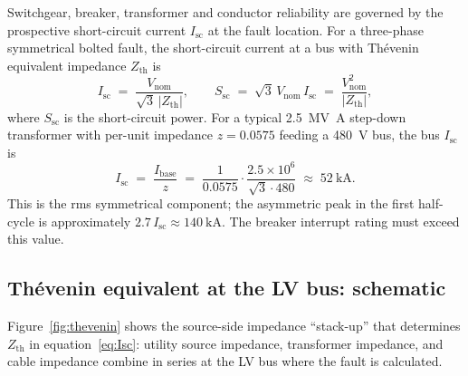 Switchgear, breaker, transformer and conductor reliability are
governed by the prospective short-circuit current $I_{\mathrm{sc}}$ at
the fault location. For a three-phase symmetrical bolted fault, the
short-circuit current at a bus with Th\'evenin equivalent impedance
$Z_{\mathrm{th}}$ is
\begin{equation}\label{eq:Isc}
   I_{\mathrm{sc}} \;=\; \frac{V_{\mathrm{nom}}}{\sqrt{3}\,|Z_{\mathrm{th}}|},
   \qquad
   S_{\mathrm{sc}} \;=\; \sqrt{3}\,V_{\mathrm{nom}}\,I_{\mathrm{sc}}
   \;=\; \frac{V_{\mathrm{nom}}^2}{|Z_{\mathrm{th}}|},
\end{equation}
where $S_{\mathrm{sc}}$ is the short-circuit power. For a typical
\SI{2.5}{\mega\volt\ampere} step-down transformer with per-unit
impedance $z=0.0575$ feeding a \SI{480}{V} bus, the bus
$I_{\mathrm{sc}}$ is
\begin{equation}
   I_{\mathrm{sc}}
   \;=\; \frac{I_{\mathrm{base}}}{z}
   \;=\; \frac{1}{0.0575}\cdot\frac{2.5\times 10^6}{\sqrt{3}\cdot 480}
   \;\approx\; \SI{52}{\kilo\ampere}.
\end{equation}
This is the rms symmetrical component; the asymmetric peak in the
first half-cycle is approximately $2.7\,I_{\mathrm{sc}}\approx
\SI{140}{\kilo\ampere}$. The breaker interrupt rating must exceed
this value.

\subsection{Thévenin equivalent at the LV bus: schematic}\label{ss:thevenin}

Figure~\ref{fig:thevenin} shows the source-side impedance ``stack-up''
that determines $Z_{\mathrm{th}}$ in equation~\eqref{eq:Isc}: utility
source impedance, transformer impedance, and cable impedance combine
in series at the LV bus where the fault is calculated.

